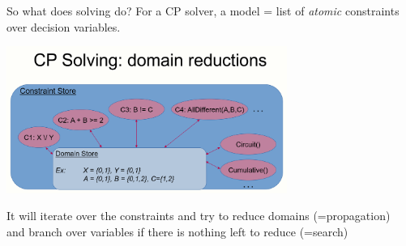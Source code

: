 \documentclass{cons-beamer}
\begin{document}
\begin{frame}{So what does solving do?}
  For a CP solver, a model = list of \textit{atomic} constraints over decision variables.
  
  \begin{center}
    \includegraphics[height=48mm, trim=0 0 0 50mm, clip]{images/constraint_store} %
  \end{center}
  
  It will iterate over the constraints and try to reduce domains (=propagation) \\
  and branch over variables if there is nothing left to reduce (=search)
\end{frame}
\end{document}
